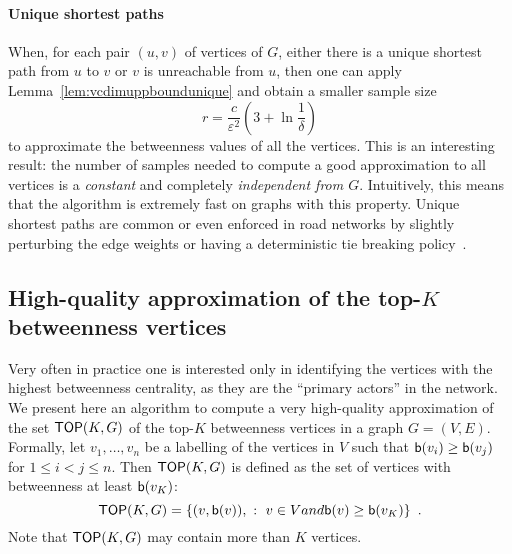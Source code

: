 \paragraph{Unique shortest paths} 
When, for each pair $(u,v)$ of vertices of $G$, either there is a unique
shortest path from $u$ to $v$ or $v$ is unreachable from $u$, 
 then one can apply Lemma~\ref{lem:vcdimuppboundunique} and obtain a smaller
sample size
\[
  r= \frac{c}{\varepsilon^2}\left(3+\ln\frac{1}{\delta}\right)
\]
to approximate the betweenness values of all the vertices. 
This is an interesting result: the number of samples needed to compute a good
approximation to all vertices is a \emph{constant} and completely
\emph{independent from $G$}. Intuitively, this means that the algorithm is
extremely fast on graphs with this property. Unique shortest paths are common or
even enforced in road networks by slightly perturbing the edge weights or having
a deterministic tie breaking policy~\citep{GeisbergerSS08}.


\subsection{High-quality approximation of the top-$K$ betweenness
vertices}\label{sec:topk}

Very often in practice one is interested only in identifying the vertices with
the highest betweenness centrality, as they are the ``primary actors'' in the
network. We present here an algorithm to compute a very high-quality
approximation of the set $\mathsf{TOP}(K,G)$ of the top-$K$ betweenness vertices in a graph
$G=(V,E)$. Formally, let $v_1,\dotsc,v_n$ be a labelling of the vertices in $V$
such that $\mathsf{b}(v_i)\ge\mathsf{b}(v_j)$ for $1\le i<j\le n$. Then $\mathsf{TOP}(K,G)$ is
defined as the set of vertices with betweenness at least $\mathsf{b}(v_K)$:
\[
\mathsf{TOP}(K,G)=\{(v,\mathsf{b}(v)), ~:~ v\in V \relax{ and } \mathsf{b}(v)\ge\mathsf{b}(v_K)\}\enspace.
\]
Note that $\mathsf{TOP}(K,G)$ may contain more than $K$ vertices. 

